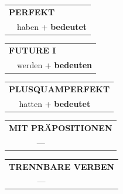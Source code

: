 \documentclass[10pt,a4paper]{revtex4-2}
\begin{document}
\begin{verbbox-acc}
    \vspace{10pt}

 \begin{tabular}{rl}
     \multicolumn{2}{l}{\textbf{PERFEKT}}\\
   & haben + \textbf{bedeutet}\\
  \end{tabular}
\hfill
   \begin{tabular}{rl}
   
    \multicolumn{2}{l}{\textbf{FUTURE I} }\\
   & werden + \textbf{bedeuten}\\
 
  \end{tabular}
\hfill
   \begin{tabular}{rl}
      \multicolumn{2}{l}{\textbf{PLUSQUAMPERFEKT}}\\
   & hatten + \textbf{bedeutet}\\
  \end{tabular}
  
\vspace{10pt}

\begin{tabular}{lll}
\multicolumn{3}{l}{\textbf{MIT PRÄPOSITIONEN}}\\
& ---\\
\end{tabular}
\hfill
\begin{tabular}{lll}
\multicolumn{3}{l}{\textbf{TRENNBARE VERBEN}}\\
& ---\\
\end{tabular}

\vspace{-5pt}


\end{verbbox-acc}
\end{document}

